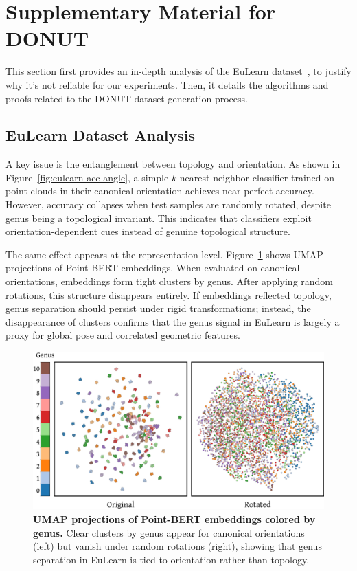 \clearpage
\section{Supplementary Material for DONUT}
\label{sec:suppl_topogen}


This section first provides an in-depth analysis of the EuLearn dataset~\cite{eulearn}, to justify why it's not reliable for our experiments. Then, it details the algorithms and proofs related to the DONUT dataset generation process.

\subsection{EuLearn Dataset Analysis}
\label{ssec:suppl_eulearn_analysis}

A key issue is the entanglement between topology and orientation. As shown in Figure~\ref{fig:eulearn-acc-angle}, a simple $k$-nearest neighbor classifier trained on point clouds in their canonical orientation achieves near-perfect accuracy. However, accuracy collapses when test samples are randomly rotated, despite genus being a topological invariant. This indicates that classifiers exploit orientation-dependent cues instead of genuine topological structure.


The same effect appears at the representation level. Figure~\ref{fig:eulearn-umap-comparison} shows UMAP projections of Point-BERT embeddings. When evaluated on canonical orientations, embeddings form tight clusters by genus. After applying random rotations, this structure disappears entirely. If embeddings reflected topology, genus separation should persist under rigid transformations; instead, the disappearance of clusters confirms that the genus signal in EuLearn is largely a proxy for global pose and correlated geometric features.

\begin{figure}[h]
  \centering
  \includegraphics[width=0.7\linewidth]{figs/eulearn/umap_comparison_original_rotated.pdf}
   \caption{\textbf{UMAP projections of Point-BERT embeddings colored by genus.} Clear clusters by genus appear for canonical orientations (left) but vanish under random rotations (right), showing that genus separation in EuLearn is tied to orientation rather than topology.}
   \label{fig:eulearn-umap-comparison}
\end{figure}

